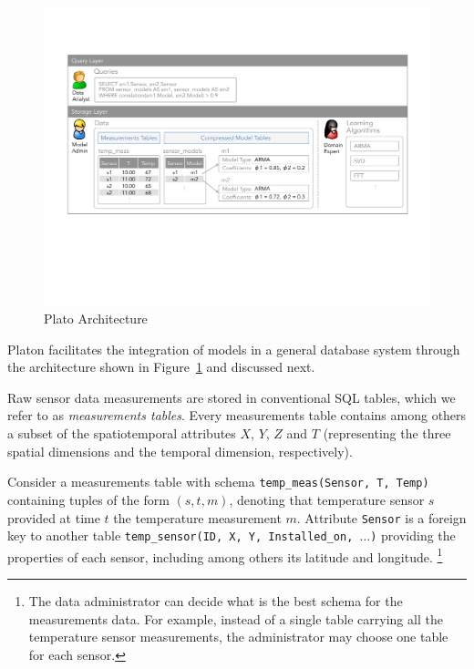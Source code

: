 \begin{figure}
\center
\includegraphics[width=\textwidth]{fig-architecture.pdf}
\caption{Plato Architecture}
\label{fig:basic-architecture}
\vspace*{-0.5cm}
\end{figure}

Platon facilitates the integration of models in a general database system through the architecture shown in Figure~\ref{fig:basic-architecture} and discussed next.

Raw sensor data measurements are stored in conventional SQL tables, which we refer to as {\em measurements tables}. Every measurements table contains among others a subset of the spatiotemporal attributes $X$, $Y$, $Z$ and $T$ (representing the three spatial dimensions and the temporal dimension, respectively).

\vspace*{0.5cm}
\begin{example}
Consider a measurements table with schema \texttt{temp\_meas(Sensor, T, Temp)} containing tuples of the form $(s, t, m)$, denoting that temperature sensor $s$ provided at time $t$ the temperature measurement $m$.
Attribute \texttt{Sensor} is a foreign key to another table \texttt{temp\_sensor(ID, X, Y, Installed\_on, $\ldots$)} providing the properties of each sensor, including among others its latitude and longitude.
\footnote{The data administrator can decide what is the best schema for the measurements data. For example, instead of a single table carrying all the temperature sensor measurements, the administrator may choose one table for each sensor.
}
\end{example}
\vspace*{0.5cm}

